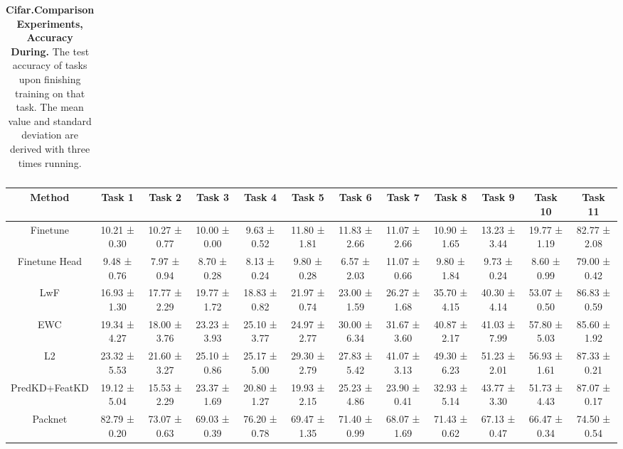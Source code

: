 \begin{sidewaystable}[ht]
\begin{adjustbox}{max width=\textwidth}
\begin{tabular}{|c|c|c|c|c|c|c|c|c|c|c|c|}
\hline
\end{tabular}
\end{adjustbox}
\caption{\textbf{Cifar.Comparison Experiments, Accuracy During.} The test accuracy of tasks upon finishing training on that task. The mean value and standard deviation are derived with three times running.}
\end{sidewaystable}


\begin{sidewaystable}[ht]
\centering
\renewcommand{\arraystretch}{1.6}
\setlength{\tabcolsep}{0.9\tabcolsep}
\begin{adjustbox}{max width=\textwidth}
\begin{tabular}{|c|c|c|c|c|c|c|c|c|c|c|c|}
\hline
Method & Task 1 & Task 2 & Task 3 & Task 4 & Task 5 & Task 6 & Task 7 & Task 8 & Task 9 & Task 10 & Task 11 \\
\hline
Finetune & 10.21 ± 0.30 & 10.27 ± 0.77 & 10.00 ± 0.00 & 9.63 ± 0.52 & 11.80 ± 1.81 & 11.83 ± 2.66 & 11.07 ± 2.66 & 10.90 ± 1.65 & 13.23 ± 3.44 & 19.77 ± 1.19 & 82.77 ± 2.08\\
\hline
Finetune Head & 9.48 ± 0.76 & 7.97 ± 0.94 & 8.70 ± 0.28 & 8.13 ± 0.24 & 9.80 ± 0.28 & 6.57 ± 2.03 & 11.07 ± 0.66 & 9.80 ± 1.84 & 9.73 ± 0.24 & 8.60 ± 0.99 & 79.00 ± 0.42 \\
\hline
LwF & 16.93 ± 1.30 & 17.77 ± 2.29 & 19.77 ± 1.72 & 18.83 ± 0.82 & 21.97 ± 0.74 & 23.00 ± 1.59 & 26.27 ± 1.68 & 35.70 ± 4.15 & 40.30 ± 4.14 & 53.07 ± 0.50 & 86.83 ± 0.59 \\
\hline
EWC & 19.34 ± 4.27 & 18.00 ± 3.76 & 23.23 ± 3.93 & 25.10 ± 3.77 & 24.97 ± 2.77 & 30.00 ± 6.34 & 31.67 ± 3.60 & 40.87 ± 2.17 & 41.03 ± 7.99 & 57.80 ± 5.03 & 85.60 ± 1.92 \\
\hline
L2 & 23.32 ± 5.53 & 21.60 ± 3.27 & 25.10 ± 0.86 & 25.17 ± 5.00 & 29.30 ± 2.79 & 27.83 ± 5.42 & 41.07 ± 3.13 & 49.30 ± 6.23 & 51.23 ± 2.01 & 56.93 ± 1.61 & 87.33 ± 0.21  \\
\hline
PredKD+FeatKD & 19.12 ± 5.04 & 15.53 ± 2.29 & 23.37 ± 1.69 & 20.80 ± 1.27 & 19.93 ± 2.15 & 25.23 ± 4.86 & 23.90 ± 0.41 & 32.93 ± 5.14 & 43.77 ± 3.30 & 51.73 ± 4.43 & 87.07 ± 0.17  \\
\hline
Packnet & 82.79 ± 0.20 & 73.07 ± 0.63 & 69.03 ± 0.39 & 76.20 ± 0.78 & 69.47 ± 1.35 & 71.40 ± 0.99 & 68.07 ± 1.69 & 71.43 ± 0.62 & 67.13 ± 0.47 & 66.47 ± 0.34 & 74.50 ± 0.54   \\

\end{tabular}
\end{adjustbox}
\end{sidewaystable}
